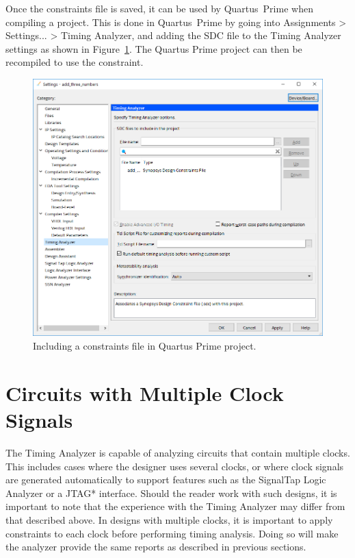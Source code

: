 \documentclass[11pt, twoside, pdftex]{article}
\begin{document}
Once the constraints file is saved, it can be used by Quartus~Prime when compiling a project. This 
is done in Quartus~Prime by going into {\sf Assignments > Settings... > Timing Analyzer}, 
and adding the SDC file to the Timing Analyzer settings as shown 
in Figure~\ref{fig:14}. The Quartus Prime project can then be recompiled to use the constraint.

\begin{figure}[H]
\begin{center}
\includegraphics[scale=0.55]{figures/figure14.png}
\end{center}
\caption{Including a constraints file in Quartus Prime project.}
\label{fig:14}
\end{figure}

\section{Circuits with Multiple Clock Signals}
\label{sec:mult}

The Timing Analyzer is capable of analyzing circuits that contain multiple clocks. This includes cases where 
the designer uses several clocks, or where clock signals are generated automatically to 
support features such as the SignalTap Logic Analyzer or a JTAG* interface. Should the reader 
work with such designs, it is important to note that the experience with the Timing Analyzer may differ 
from that described above. In designs with multiple clocks, it is important to apply constraints
to each clock before performing timing analysis. Doing so will make the analyzer provide 
the same reports as described in previous sections.
\end{document}
